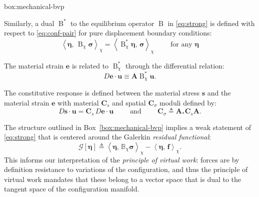 \begin{ambox}{box:mechanical-bvp}
{\begin{description}
Similarly, a dual
\(\operatorname{B}^*\) to the equilibrium operator \(\operatorname{B}\) in
\eqref{eq:strong} is defined with respect to \eqref{eq:conf-pair} for pure displacement boundary conditions:
\begin{equation}
  \left<\boldsymbol{\eta},\, \operatorname{B}_\chi\boldsymbol{\sigma}\right>_\chi = \left<\operatorname{B}_\chi^*\boldsymbol{\eta},\, \boldsymbol{\sigma}\right>_\chi
  \qquad \text{ for any }\boldsymbol{\eta}
  \label{eq:def-adjoint}
\end{equation}
%
\item[Strain]
The material strain \(\boldsymbol{e}\) is related to 
\(\operatorname{B}^*_\chi\) through the differential relation: 
\begin{equation}
  D\boldsymbol{e}\cdot\boldsymbol{u} \equiv \boldsymbol{A}\operatorname{B}^*_\chi \boldsymbol{u}.
  \label{eq:vstrain}
\end{equation}
%
\item[Constitution]
The constitutive response is defined between the material stress
\(\boldsymbol{s}\) and the material strain \(\boldsymbol{e}\) with material \(\boldsymbol{C}_s\) and
spatial \(\boldsymbol{C}_\sigma\) moduli defined by:
\begin{equation}
  D \boldsymbol{s}\cdot \boldsymbol{u} = \boldsymbol{C}_s \, D \boldsymbol{e}\cdot {\boldsymbol{u}}
  \qquad\text{ and }\qquad
  \boldsymbol{C}_\sigma \triangleq \boldsymbol{A}_*\boldsymbol{C}_s\boldsymbol{A}.
  \label{eq:def-moduli}
\end{equation}
\end{description}
}
\end{ambox}

The structure outlined in Box~\ref{box:mechanical-bvp} 
implies a weak statement
of \eqref{eq:strong} that is centered around the Galerkin \emph{residual functional}:
%
\begin{equation}
\mathcal{G}\left[\boldsymbol{\eta}\right] \triangleq \left< \boldsymbol{\eta}, \, \mathbb{B}_\chi \boldsymbol{\sigma}\right>_\chi - \left< \boldsymbol{\eta}, \, \boldsymbol{f}\right>_\chi.
\label{eq:galerkin}
\end{equation}
This informs our interpretation of the \emph{principle of virtual work}: forces are by definition resistance to variations of the configuration, and thus the principle of virtual work mandates that these belong to a vector space that is dual to the tangent space of the configuration manifold.



